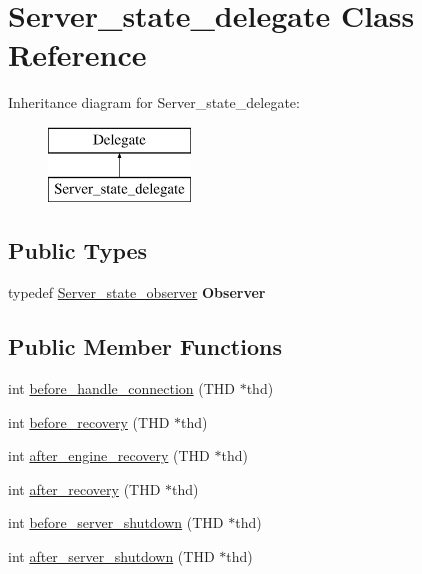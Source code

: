 \hypertarget{classServer__state__delegate}{}\section{Server\+\_\+state\+\_\+delegate Class Reference}
\label{classServer__state__delegate}
Inheritance diagram for Server\+\_\+state\+\_\+delegate\+:\begin{figure}[H]
\begin{center}
\leavevmode
\includegraphics[height=2.000000cm]{classServer__state__delegate}
\end{center}
\end{figure}
\subsection*{Public Types}
\begin{DoxyCompactItemize}
\item 
\mbox{\label{classServer__state__delegate_a101a9d74be984136643ce3b30b304943}} 
typedef \mbox{\hyperlink{structServer__state__observer}{Server\+\_\+state\+\_\+observer}} {\bfseries Observer}
\end{DoxyCompactItemize}
\subsection*{Public Member Functions}
\begin{DoxyCompactItemize}
\item 
int \mbox{\hyperlink{classServer__state__delegate_a2571fe4639eca1ab37417c1cef9a051f}{before\+\_\+handle\+\_\+connection}} (T\+HD $\ast$thd)
\item 
int \mbox{\hyperlink{classServer__state__delegate_a9a19117db22f1ac1371cfe804ab1d49a}{before\+\_\+recovery}} (T\+HD $\ast$thd)
\item 
int \mbox{\hyperlink{classServer__state__delegate_a770a99160c8bbc8fe97b28c53a972a50}{after\+\_\+engine\+\_\+recovery}} (T\+HD $\ast$thd)
\item 
int \mbox{\hyperlink{classServer__state__delegate_a8d4a66660e9d9f463eb3719271cfffe8}{after\+\_\+recovery}} (T\+HD $\ast$thd)
\item 
int \mbox{\hyperlink{classServer__state__delegate_a37e23e031cc508febdd6e6a74198e95a}{before\+\_\+server\+\_\+shutdown}} (T\+HD $\ast$thd)
\item 
int \mbox{\hyperlink{classServer__state__delegate_a16548382b069173cb1e1bb29b621dfe5}{after\+\_\+server\+\_\+shutdown}} (T\+HD $\ast$thd)
\end{DoxyCompactItemize}


